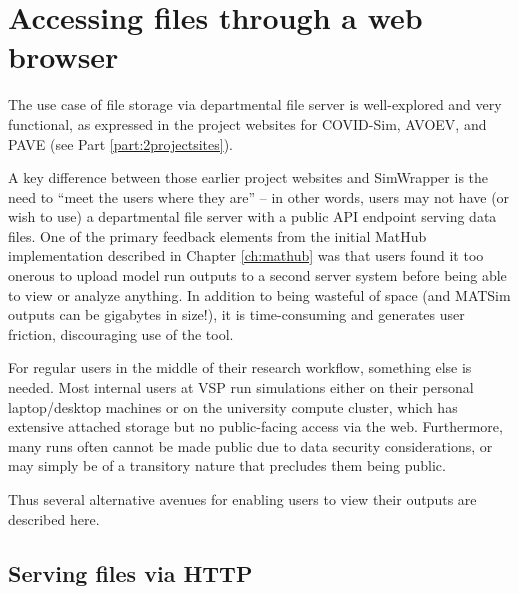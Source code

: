 
\hypertarget{simwrapper-accessing-files-through-a-web-browser}{%
\section{Accessing files through a web browser}
\label{simwrapper-accessing-files-through-a-web-browser}}

The use case of file storage via departmental file server is well-explored and very functional, as expressed in the project websites for COVID-Sim, AVOEV, and PAVE (see Part \ref{part:2projectsites}).

A key difference between those earlier project websites and SimWrapper is the need to ``meet the users where they are'' -- in other words, users may not have (or wish to use) a departmental file server with a public API endpoint serving data files. One of the primary feedback elements from the initial MatHub implementation described in Chapter \ref{ch:mathub} was that users found it too onerous to upload model run outputs to a second server system before being able to view or analyze anything. In addition to being wasteful of space (and MATSim outputs can be gigabytes in size!), it is time-consuming and generates user friction, discouraging use of the tool.

For regular users in the middle of their research workflow, something else is needed. Most internal users at VSP run simulations either on their personal laptop/desktop machines or on the university compute cluster, which has extensive attached storage but no public-facing access via the web. Furthermore, many runs often cannot be made public due to data security considerations, or may simply be of a transitory nature that precludes them being public.

Thus several alternative avenues for enabling users to view their outputs are described here.


\hypertarget{simwrapper-how-simwrapper-access-files-via-http}{%
\subsection{Serving files via HTTP}
\label{simwrapper-how-simwrapper-access-files-via-http}}

